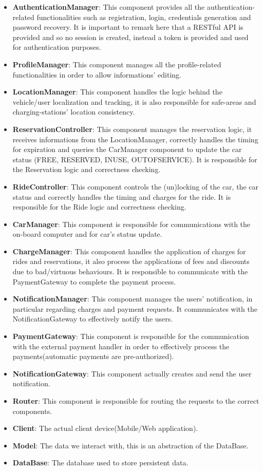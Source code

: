 \begin{itemize}
	\item \textbf{AuthenticationManager}: This component provides all the authentication-related functionalities such as registration, login, credentials generation and password recovery. It is important to remark here that a RESTful API is provided and so no session is created, instead a token is provided and used for authentication purposes.
	\item \textbf{ProfileManager}: This component manages all the profile-related functionalities in order to allow informations' editing.
	\item \textbf{LocationManager}: This component handles the logic behind the vehicle/user localization and tracking, it is also responsible for safe-areas and charging-stations' location consistency.
	\item \textbf{ReservationController}: This component manages the reservation logic, it receives informations from the LocationManager, correctly handles the timing for expiration and queries the CarManager component to update the car status (FREE, RESERVED, INUSE, OUTOFSERVICE). It is responsible for the Reservation logic and correctness checking.
	\item \textbf{RideController}: This component controls the (un)locking of the car, the car status and correctly handles the timing and charges for the ride. It is responsible for the Ride logic and correctness checking.
	\item \textbf{CarManager}: This component is responsible for communications with the on-board computer and for car's status update.
	\item \textbf{ChargeManager}: This component handles the application of charges for rides and reservations, it also process the applications of fees and discounts due to bad/virtuous behaviours. It is responsible to communicate with the PaymentGateway to complete the payment process.
	\item \textbf{NotificationManager}: This component manages the users' notification, in particular regarding charges and payment requests. It communicates with the NotificationGateway to effectively notify the users.
	\item \textbf{PaymentGateway}: This component is responsible for the communication with the external payment handler in order to effectively process the payments(automatic payments are pre-authorized).
	\item \textbf{NotificationGateway}: This component actually creates and send the user notification.
	\item \textbf{Router}: This component is responsible for routing the requests to the correct components.
	\item \textbf{Client}: The actual client device(Mobile/Web application).
	\item \textbf{Model}: The data we interact with, this is an abstraction of the DataBase.
	\item \textbf{DataBase}: The database used to store persistent data.
\end{itemize}

